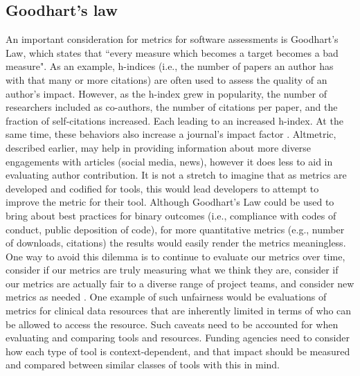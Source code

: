 \documentclass{article}
\begin{document}
\subsection{Goodhart's law}
An important consideration for metrics for software assessments is Goodhart's Law, which states that “every measure which becomes a target becomes a bad measure\cite{hoskin_awful_1996}". As an example, h-indices (i.e., the number of papers an author has with that many or more citations) are often used to assess the quality of an author’s impact. However, as the h-index grew in popularity, the number of researchers included as co-authors, the number of citations per paper, and the fraction of self-citations increased. Each leading to an increased h-index. At the same time, these behaviors also increase a journal’s impact factor \cite{fire_over-optimization_2019}. Altmetric, described earlier, may help in providing information about more diverse engagements with articles (social media, news), however it does less to aid in evaluating author contribution. It is not a stretch to imagine that as metrics are developed and codified for tools, this would lead developers to attempt to improve the metric for their tool. Although Goodhart’s Law could be used to bring about best practices for binary outcomes (i.e., compliance with codes of conduct, public deposition of code), for more quantitative metrics (e.g., number of downloads, citations) the results would easily render the metrics meaningless. One way to avoid this dilemma is to continue to evaluate our metrics over time, consider if our metrics are truly measuring what we think they are, consider if our metrics are actually fair to a diverse range of project teams, and consider new metrics as needed \cite{fire_over-optimization_2019}. One example of such unfairness would be evaluations of metrics for clinical data resources that are inherently limited in terms of who can be allowed to access the resource. Such caveats need to be accounted for when evaluating and comparing tools and resources. Funding agencies need to consider how each type of tool is context-dependent, and that impact should be measured and compared between similar classes of tools with this in mind. 
\end{document}
